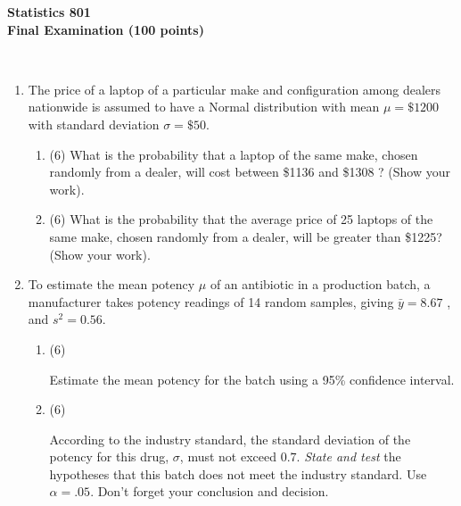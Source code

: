\documentclass[11pt]{article}
\begin{document}
\begin{center}
  \textbf{\large Statistics 801\\
  Final Examination (100 points)}
\end{center}
\\[.1in]
\begin{enumerate}
\item  The price of a  laptop of a particular make and configuration among
dealers nationwide is assumed to have a Normal
distribution with mean $\mu =\$1200$ with standard deviation
$\sigma =\$50$.
\begin{enumerate}  
\item(6)  What is the  probability that a laptop of the same make, chosen 
randomly from a dealer, will cost between \$1136 and  \$1308 ?  (Show your work).\\[2in]
\item(6) What is the  probability that the average price of 25 laptops of the same make, chosen  randomly from a dealer, will be greater than \$1225?  (Show your work). \\[2in]
 \end{enumerate}
 \item To estimate the mean potency  $\mu$ of an antibiotic in a production batch, a manufacturer takes potency readings of 14 random samples, giving $\bar{y}=8.67$ , and $s^2=0.56$.
 \begin{enumerate}
  \item (6) \parbox[t]{6in}{Estimate the mean potency for the batch using a 95\% confidence interval.}
\newpage
  \item (6) \parbox[t]{6in}{According to the industry standard, the standard deviation of the potency for this drug, $\sigma$, must not  exceed $0.7$. \emph{State and test} the hypotheses that this batch does not meet the industry standard. Use $\alpha = .05$. Don't forget your conclusion and decision.}\\[2in]
  \end{enumerate}



\end{enumerate}
\end{document}
